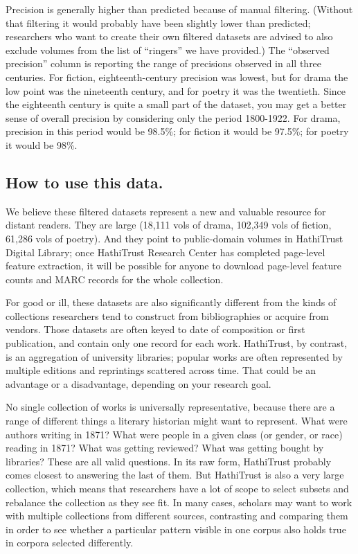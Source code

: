 \documentclass[paper=a4, fontsize=12pt]{scrartcl}
\numberwithin{equation}{section}		%
\numberwithin{figure}{section}			%
\numberwithin{table}{section}				%
\begin{document}
Precision is generally higher than predicted because of manual filtering. (Without that filtering it would probably have been slightly lower than predicted; researchers who want to create their own filtered datasets are advised to also exclude volumes from the list of ``ringers'' we have provided.) The ``observed precision'' column is reporting the range of precisions observed in all three centuries. For fiction, eighteenth-century precision was lowest, but for drama the low point was the nineteenth century, and for poetry it was the twentieth. Since the eighteenth century is quite a small part of the dataset, you may get a better sense of overall precision by considering only the period 1800-1922. For drama, precision in this period would be 98.5\%; for fiction it would be 97.5\%; for poetry it would be 98\%.

\subsection{How to use this data.}

We believe these filtered datasets represent a new and valuable resource for distant readers. They are large (18,111 vols of drama, 102,349 vols of fiction, 61,286 vols of poetry). And they point to public-domain volumes in HathiTrust Digital Library; once HathiTrust Research Center has completed page-level feature extraction, it will be possible for anyone to download page-level feature counts and MARC records for the whole collection.

For good or ill, these datasets are also significantly different from the kinds of collections researchers tend to construct from bibliographies or acquire from vendors. Those datasets are often keyed to date of composition or first publication, and contain only one record for each work. HathiTrust, by contrast, is an aggregation of university libraries; popular works are often represented by multiple editions and reprintings scattered across time. That could be an advantage or a disadvantage, depending on your research goal.

No single collection of works is universally representative, because there are a range of different things a literary historian might want to represent. What were authors writing in 1871? What were people in a given class (or gender, or race) reading in 1871? What was getting reviewed? What was getting bought by libraries? These are all valid questions. In its raw form, HathiTrust probably comes closest to answering the last of them. But HathiTrust is also a very large collection, which means that researchers have a lot of scope to select subsets and rebalance the collection as they see fit. In many cases, scholars may want to work with multiple collections from different sources, contrasting and comparing them in order to see whether a particular pattern visible in one corpus also holds true in corpora selected differently.
\end{document}
